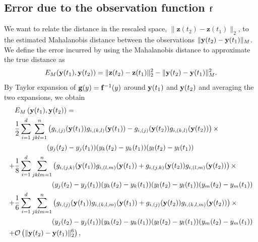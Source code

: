 \subsection{Error due to the observation function $\mathbf{f}$}

We want to relate the distance in the rescaled space, $\|\mathbf{z}(t_2) - \mathbf{z}(t_1)\|_2$, to the estimated Mahalanobis distance between the observations $\| \mathbf{y}(t_2) - \mathbf{y}(t_1)\|_M$.
%
We define the error incurred by using the Mahalanobis distance to approximate the true distance as
\begin{equation}
E_M(\mathbf{y}(t_1), \mathbf{y}(t_2)) = \|\mathbf{z}(t_2) - \mathbf{z}(t_1)\|_2^2 - \| \mathbf{y}(t_2) - \mathbf{y}(t_1)\|^2_M .
\end{equation}
%
By Taylor expansion of $\mathbf{g}(y) = \mathbf{f}^{-1}(y)$ around $\mathbf{y}(t_1)$ and $\mathbf{y}(t_2)$ and averaging the two expansions, we obtain
%
\begin{equation} \label{eq:mahanaobis_error}
\begin{aligned}
& E_M\left( \mathbf{y}(t_1), \mathbf{y}(t_2) \right)
 = \\
& \begin{aligned}[t]
 \frac{1}{2} \sum_{i=1}^d \sum_{jkl=1}^{n} &
\left( g_{i, (j)} (\mathbf{y}(t_1)) g_{i, (k,l)} (\mathbf{y}(t_1)) -  g_{i, (j)} (\mathbf{y}(t_2)) g_{i, (k,l)} (\mathbf{y}(t_2)) \right) \times \\
& (y_j(t_2) - y_j(t_1)) (y_k(t_2) - y_k(t_1))(y_l(t_2) - y_l(t_1))
\end{aligned} \\
+&
\begin{aligned}[t]
\frac{1}{8} \sum_{i=1}^d \sum_{jklm=1}^n  &
\left( g_{i, (j,k)} (\mathbf{y}(t_1)) g_{i, (l,m)} (\mathbf{y}(t_1)) +  g_{i, (j,k)} (\mathbf{y}(t_2)) g_{i, (l,m)} (\mathbf{y}(t_2)) \right) \times
 \\
&(y_j(t_2) - y_j(t_1))  (y_k(t_2) - y_k(t_1))(y_l(t_2) - y_l(t_1)) (y_m(t_2) - y_m(t_1))
\end{aligned} \\
+&
\begin{aligned} [t]
\frac{1}{6} \sum_{i=1}^d \sum_{jklm=1}^n &
\left( g_{i, (j)} (\mathbf{y}(t_1)) g_{i, (k,l,m)} (\mathbf{y}(t_1)) +  g_{i, (j)} (\mathbf{y}(t_2)) g_{i, (k,l,m)} (\mathbf{y}(t_2)) \right) \times \\
& (y_j(t_2) - y_j(t_1))  (y_k(t_2) - y_k(t_1))(y_l(t_2) - y_l(t_1))(y_m(t_2) - y_m(t_1))
\end{aligned} \\
+& \mathcal{O} \left(\| \mathbf{y}(t_2) - \mathbf{y}(t_1) \|^6_2 \right) ,
\end{aligned}
\end{equation}
